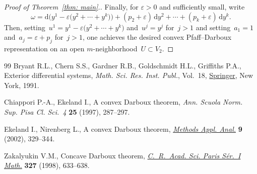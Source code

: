 \documentclass[11pt]{article}
\numberwithin{equation}{section}
\renewcommand{\d}{\mathrm{d}}%
\numberwithin{equation}{section}
\begin{document}
\begin{proof}[Proof of Theorem~\ref{thm: main}.]
Finally, for $\varepsilon>0$ and sufficiently small, write
\[
\omega = \d\bigl(y^1-\varepsilon\big(y^2{+}\cdots{+}y^k\big)\bigr)
   + (p_2 + \varepsilon)\,\d y^2
   + \cdots + (p_k + \varepsilon)\,\d y^k.
\]
Then, setting~$u^1 = y^1-\varepsilon\big(y^2+\cdots+y^k\big)$ and~$u^j = y^j$
for~$j>1$ and setting~$a_1 = 1$ and~${a_j = \varepsilon + p_j}$ for~$j>1$,
one achieves the desired convex Pfaff--Darboux representation
on an open $m$-neigh\-bor\-hood~$U\subset V_2$.
\end{proof}
\begin{thebibliography}{99}
Bryant R.L., Chern S.S., Gardner R.B., Goldschmidt H.L., Griffiths P.A.,
 Exterior differential systems, \textit{Math. Sci. Res. Inst. Publ.}, Vol.~18,
 \href{https://doi.org/10.1007/978-1-4613-9714-4}{Springer}, New York, 1991.

Chiappori P.-A., Ekeland I., A convex {D}arboux theorem, \textit{Ann. Scuola
 Norm. Sup. Pisa Cl. Sci.~4} \textbf{25} (1997), 287--297.

Ekeland I., Nirenberg L., A convex {D}arboux theorem, \href{https://doi.org/10.4310/MAA.2002.v9.n3.a3}{\textit{Methods Appl. Anal.}} \textbf{9} (2002), 329--344.

Zakalyukin V.M., Concave {D}arboux theorem, \href{https://doi.org/10.1016/S0764-4442(99)80092-5}{\textit{C.~R.~Acad. Sci. Paris
 S\'{e}r.~{I} Math.}} \textbf{327} (1998), 633--638.

\end{thebibliography}
\end{document}
